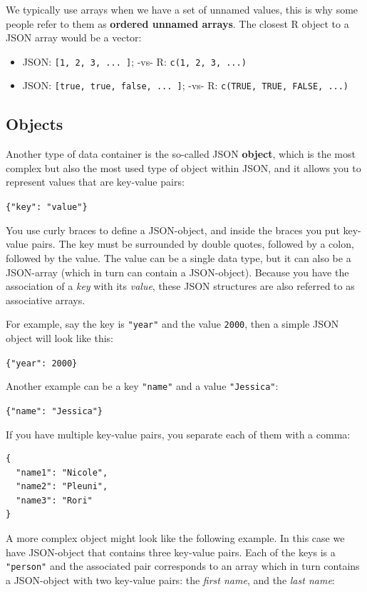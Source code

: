 \documentclass[
]{book}
\begin{document}
We typically use arrays when we have a set of unnamed values, this is why some
people refer to them as \textbf{ordered unnamed arrays}. The closest R object to a
JSON array would be a vector:

\begin{itemize}
\item
  JSON: \texttt{{[}1,\ 2,\ 3,\ ...\ {]}}; -vs- R: \texttt{c(1,\ 2,\ 3,\ ...)}
\item
  JSON: \texttt{{[}true,\ true,\ false,\ ...\ {]}}; -vs- R: \texttt{c(TRUE,\ TRUE,\ FALSE,\ ...)}
\end{itemize}

\hypertarget{objects}{%
\subsection{Objects}\label{objects}}

Another type of data container is the so-called JSON \textbf{object}, which is the
most complex but also the most used type of object within JSON, and it allows
you to represent values that are key-value pairs:

\texttt{\{"key":\ "value"\}}

You use curly braces to define a JSON-object, and inside the braces you put
key-value pairs. The key must be surrounded by double quotes, followed by a
colon, followed by the value. The value can be a single data type, but it
can also be a JSON-array (which in turn can contain a JSON-object). Because
you have the association of a \emph{key} with its \emph{value}, these JSON structures
are also referred to as associative arrays.

For example, say the key is \texttt{"year"} and the value \texttt{2000}, then a simple JSON
object will look like this:

\texttt{\{"year":\ 2000\}}

Another example can be a key \texttt{"name"} and a value \texttt{"Jessica"}:

\texttt{\{"name":\ "Jessica"\}}

If you have multiple key-value pairs, you separate each of them with a comma:

\begin{verbatim}
{
  "name1": "Nicole",
  "name2": "Pleuni",
  "name3": "Rori"
}
\end{verbatim}

A more complex object might look like the following example. In this case we
have JSON-object that contains three key-value pairs. Each of the keys is a
\texttt{"person"} and the associated pair corresponds to an array which in turn
contains a JSON-object with two key-value pairs: the \emph{first name}, and the
\emph{last name}:
\end{document}
